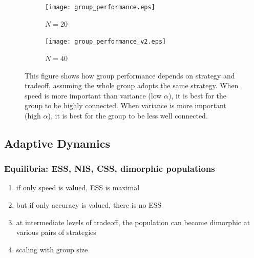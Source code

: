 \documentclass{article}
\begin{document}
\begin{figure}
\begin{subfigure}{\textwidth}
\begin{center}
\texttt{[image: group\_performance.eps]}
\end{center}
\caption{$N=20$}
\end{subfigure}
\begin{subfigure}{\textwidth}
\begin{center}
\texttt{[image: group\_performance\_v2.eps]}
\end{center}
\caption{$N=40$}
\end{subfigure}
\caption{\label{group_performance} This figure shows how group performance depends on strategy and tradeoff, assuming the whole group adopts the same strategy.  When speed is more important than variance (low $\alpha$), it is best for the group to be highly connected.  When variance is more important (high $\alpha$), it is best for the group to be less well connected.}
\end{figure}


\subsection{Adaptive Dynamics }
\subsubsection{Equilibria: ESS, NIS, CSS, dimorphic populations}

\begin{enumerate}
\item if only speed is valued, ESS is maximal
\item but if only accuracy is valued, there is no ESS
\item at intermediate levels of tradeoff, the population can become dimorphic at various pairs of strategies
\item scaling with group size
\end{enumerate}
\end{document}
